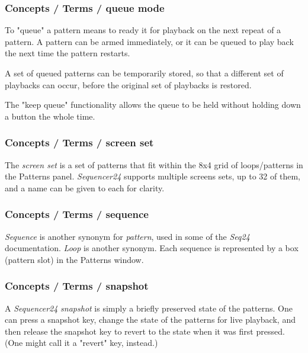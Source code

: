 \subsubsection{Concepts / Terms / queue mode}
\label{subsubsec:concepts_terms_queue_mode}

   To "queue" a pattern means to ready it for playback on the next repeat of
   a pattern.  A pattern can be armed immediately, or it can be queued to
   play back the next time the pattern restarts.

   A set of queued patterns can be temporarily stored, so that a different
   set of playbacks can occur, before the original set of playbacks is
   restored.

   The "keep queue" functionality allows the queue to be held without
   holding down a button the whole time.

\subsubsection{Concepts / Terms / screen set}
\label{subsubsec:concepts_terms_screen_set}

   The \textsl{screen set}
   is a set of patterns that fit within the 8x4 grid of loops/patterns in the
   Patterns panel.
   \textsl{Sequencer24} supports multiple screens sets, up to 32 of them,
   and a name can be given to each for clarity.

\subsubsection{Concepts / Terms / sequence}
\label{subsubsec:concepts_terms_sequence}

   \textsl{Sequence} is
   another synonym for \textsl{pattern}, used in some of the \textsl{Seq24}
   documentation.  \textsl{Loop} is another synonym.
   Each sequence is represented by a box (pattern slot) in the Patterns window.

\subsubsection{Concepts / Terms / snapshot}
\label{subsubsec:concepts_terms_snapshot}

   A \textsl{Sequencer24} \textsl{snapshot} is simply a briefly preserved
   state of the patterns.  One can press a snapshot key, change the state of
   the patterns for live playback, and then release the snapshot key to
   revert to the state when it was first pressed.  (One might call it a
   "revert" key, instead.)

